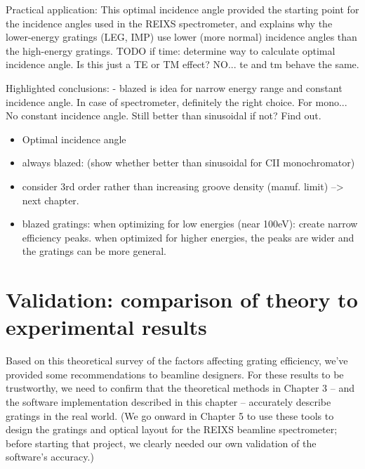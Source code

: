 	Practical application: This optimal incidence angle provided the starting point for the incidence angles used in the REIXS spectrometer, and explains why the lower-energy gratings (LEG, IMP) use lower (more normal) incidence angles than the high-energy gratings.
	TODO if time: determine way to calculate optimal incidence angle.  Is this just a TE or TM effect? NO... te and tm behave the same.
	
	
Highlighted conclusions:
	- blazed is idea for narrow energy range and constant incidence angle.  In case of spectrometer, definitely the right choice.  For mono... No constant incidence angle.  Still better than sinusoidal if not?  Find out.
	
\begin{itemize}
\item Optimal incidence angle
\item always blazed: (show whether better than sinusoidal for CII monochromator)
\item consider 3rd order rather than increasing groove density (manuf. limit) --> next chapter.
\item blazed gratings: when optimizing for low energies (near 100eV): create narrow efficiency peaks. when optimized for higher energies, the peaks are wider and the gratings can be more general.
\end{itemize}

\section{Validation: comparison of theory to experimental results}
Based on this theoretical survey of the factors affecting grating efficiency, we've provided some recommendations to beamline designers.  For these results to be trustworthy, we need to confirm that the theoretical methods in Chapter 3 -- and the software implementation described in this chapter -- accurately describe gratings in the real world.  (We go onward in Chapter 5 to use these tools to design the gratings and optical layout for the REIXS beamline spectrometer; before starting that project, we clearly needed our own validation of the software's accuracy.)

